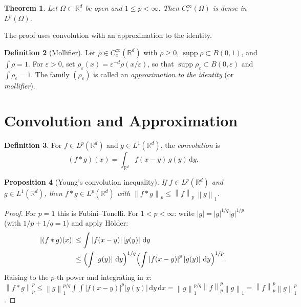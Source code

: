 \documentclass[a4paper,12pt]{book}
\DeclareMathOperator{\supp}{supp}
\newcommand{\R}{\mathbb{R}}
\newcommand{\dd}{\mathrm{d}}
\newcommand{\norm}[1]{\left\| #1 \right\|}
\newcommand{\abs}[1]{\left| #1 \right|}
\theoremstyle{definition}
\newtheorem{definition}{Definition}[chapter]
\theoremstyle{plain}
\newtheorem{theorem}[definition]{Theorem}
\newtheorem{proposition}[definition]{Proposition}
\theoremstyle{remark}
\begin{document}

\begin{theorem}\label{thm:Cc-dense}
Let $\Omega \subset \R^d$ be open and $1 \le p < \infty$. Then $C_c^\infty(\Omega)$
is dense in $L^p(\Omega)$.
\end{theorem}

The proof uses convolution with an approximation to the identity.

\begin{definition}[Mollifier]\label{def:mollifier}
Let $\rho \in C_c^\infty(\R^d)$ with $\rho \ge 0$, $\supp\rho \subset B(0,1)$,
and $\int \rho = 1$. For $\varepsilon > 0$, set
$\rho_\varepsilon(x) = \varepsilon^{-d}\rho(x/\varepsilon)$, so that
$\supp\rho_\varepsilon \subset B(0,\varepsilon)$ and $\int \rho_\varepsilon = 1$.
The family $(\rho_\varepsilon)$ is called an \emph{approximation to the identity}
(or \emph{mollifier}).
\end{definition}

\section{Convolution and Approximation}\label{sec:convolution-approx}


\begin{definition}\label{def:convolution}
For $f \in L^p(\R^d)$ and $g \in L^1(\R^d)$, the \emph{convolution} is
\[
  (f * g)(x) = \int_{\R^d} f(x - y)\, g(y)\, \dd y.
\]
\end{definition}

\begin{proposition}[Young's convolution inequality]\label{prop:young-conv}
If $f \in L^p(\R^d)$ and $g \in L^1(\R^d)$, then $f * g \in L^p(\R^d)$ with
$\norm{f * g}_p \le \norm{f}_p\, \norm{g}_1$.
\end{proposition}

\begin{proof}
For $p = 1$ this is Fubini--Tonelli. For $1 < p < \infty$:
write $\abs{g} = \abs{g}^{1/q}\abs{g}^{1/p}$ (with $1/p + 1/q = 1$) and apply
H\"older:
\begin{align*}
  \abs{(f*g)(x)}
  &\le \int \abs{f(x-y)}\abs{g(y)}\, \dd y \\
  &\le \Bigl(\int \abs{g(y)}\, \dd y\Bigr)^{1/q}
       \Bigl(\int \abs{f(x-y)}^p\abs{g(y)}\, \dd y\Bigr)^{1/p}.
\end{align*}
Raising to the $p$-th power and integrating in $x$:
$\norm{f*g}_p^p \le \norm{g}_1^{p/q} \int\!\int \abs{f(x-y)}^p\abs{g(y)}\, \dd y\, \dd x
= \norm{g}_1^{p/q}\norm{f}_p^p\norm{g}_1 = \norm{f}_p^p\norm{g}_1^p$.
\end{proof}
\end{document}
